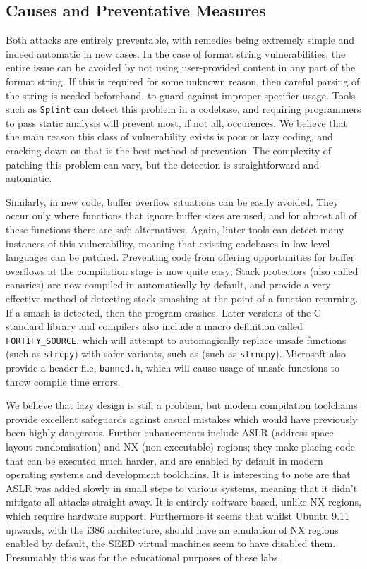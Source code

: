 \subsection{Causes and Preventative Measures}
Both attacks are entirely preventable, with remedies being extremely simple and indeed automatic in new cases.
In the case of format string vulnerabilities, the entire issue can be avoided by not using user-provided content in
any part of the format string. If this is required for some unknown reason, then careful parsing of the string 
is needed beforehand, to guard against improper specifier usage. Tools such as {\tt Splint} can detect 
this problem in a codebase\cite{splint_art}, and requiring programmers to pass static analysis will prevent most,
if not all, occurences. We believe that the main reason this class of vulnerability exists is poor or lazy
coding, and cracking down on that is the best method of prevention. The complexity of patching this problem can vary,
but the detection is straightforward and automatic.

Similarly, in new code, buffer overflow situations can be easily avoided. They occur only where functions that ignore
buffer sizes are used, and for almost all of these functions there are safe alternatives. Again, linter tools can
detect many instances of this vulnerability, meaning that existing codebases in low-level languages can be patched.
Preventing code from offering opportunities for buffer overflows at the compilation stage is now quite easy; 
Stack protectors (also called canaries) are now compiled in automatically by default, and provide a very effective
method of detecting stack smashing at the point of a function returning. If a smash is detected, then the program crashes.
Later versions of the C standard library and compilers also include a macro definition called {\tt FORTIFY\_SOURCE},
which will attempt to automagically replace unsafe functions (such as {\tt strcpy}) with safer variants, such as 
(such as {\tt strncpy})\cite{fort_source}. Microsoft also provide a header file, {\tt banned.h}, which will cause
usage of unsafe functions to throw compile time errors\cite{banned}.

We believe that lazy design is still a problem, but modern compilation toolchains provide excellent safeguards against
casual mistakes which would have previously been highly dangerous. Further enhancements include ASLR (address space
layout randomisation) and NX (non-executable) regions; they make placing code that can be executed much harder,
and are enabled by default in modern operating systems and development toolchains\cite{wiki_aslr}\cite{wiki_nx}.
It is interesting to note are that ASLR was added slowly in small steps to various systems, meaning that it didn't
mitigate all attacks straight away. It is entirely software based, unlike NX regions, which require hardware support.
Furthermore it seems that whilst Ubuntu 9.11 upwards, with the i386 architecture, should have an emulation of NX regions
enabled by default\cite{nx_bit}, the SEED virtual machines seem to have disabled them. 
Presumably this was for the educational purposes of these labs.

